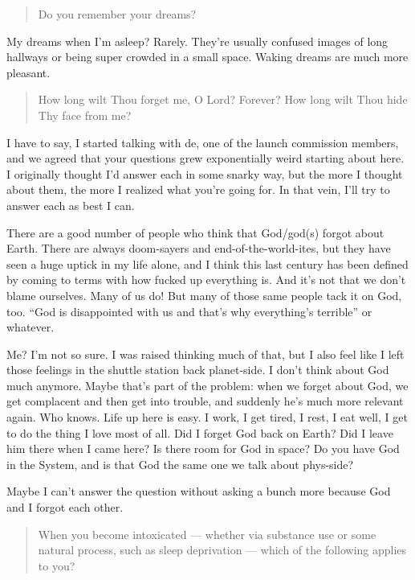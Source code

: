 \begin{quote}
Do you remember your dreams?
\end{quote}

My dreams when I'm asleep? Rarely. They're usually confused images of long hallways or being super crowded in a small space. Waking dreams are much more pleasant.

\begin{quote}
How long wilt Thou forget me, O Lord? Forever? How long wilt Thou hide Thy face from me?
\end{quote}

I have to say, I started talking with de, one of the launch commission members, and we agreed that your questions grew exponentially weird starting about here. I originally thought I'd answer each in some snarky way, but the more I thought about them, the more I realized what you're going for. In that vein, I'll try to answer each as best I can.

There are a good number of people who think that God/god(s) forgot about Earth. There are always doom-sayers and end-of-the-world-ites, but they have seen a huge uptick in my life alone, and I think this last century has been defined by coming to terms with how fucked up everything is. And it's not that we don't blame ourselves. Many of us do! But many of those same people tack it on God, too. ``God is disappointed with us and that's why everything's terrible'' or whatever.

Me? I'm not so sure. I was raised thinking much of that, but I also feel like I left those feelings in the shuttle station back planet-side. I don't think about God much anymore. Maybe that's part of the problem: when we forget about God, we get complacent and then get into trouble, and suddenly he's much more relevant again. Who knows. Life up here is easy. I work, I get tired, I rest, I eat well, I get to do the thing I love most of all. Did I forget God back on Earth? Did I leave him there when I came here? Is there room for God in space? Do you have God in the System, and is that God the same one we talk about phys-side?

Maybe I can't answer the question without asking a bunch more because God and I forgot each other.

\begin{quote}
When you become intoxicated — whether via substance use or some natural process, such as sleep deprivation — which of the following applies to you?
\end{quote}

